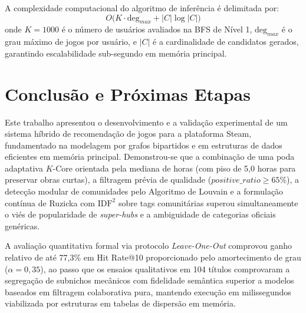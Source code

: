 \documentclass[conference]{IEEEtran}
\begin{document}
A complexidade computacional do algoritmo de inferência é delimitada por:
\begin{equation}
O\big(K \cdot \text{deg}_{max} + |C| \log |C|\big)
\end{equation}
onde $K=1000$ é o número de usuários avaliados na BFS de Nível 1, $\text{deg}_{max}$ é o grau máximo de jogos por usuário, e $|C|$ é a cardinalidade de candidatos gerados, garantindo escalabilidade sub-segundo em memória principal.

\section{Conclusão e Próximas Etapas}

Este trabalho apresentou o desenvolvimento e a validação experimental de um sistema híbrido de recomendação de jogos para a plataforma Steam, fundamentado na modelagem por grafos bipartidos e em estruturas de dados eficientes em memória principal. Demonstrou-se que a combinação de uma poda adaptativa $K$-Core orientada pela mediana de horas (com piso de 5,0 horas para preservar obras curtas), a filtragem prévia de qualidade ($positive\_ratio \ge 65\%$), a detecção modular de comunidades pelo Algoritmo de Louvain e a formulação contínua de Ruzicka com $\text{IDF}^2$ sobre tags comunitárias superou simultaneamente o viés de popularidade de \textit{super-hubs} e a ambiguidade de categorias oficiais genéricas.

A avaliação quantitativa formal via protocolo \textit{Leave-One-Out} comprovou ganho relativo de até 77,3\% em Hit Rate@10 proporcionado pelo amortecimento de grau ($\alpha = 0{,}35$), ao passo que os ensaios qualitativos em 104 títulos comprovaram a segregação de subnichos mecânicos com fidelidade semântica superior a modelos baseados em filtragem colaborativa pura, mantendo execução em milissegundos viabilizada por estruturas em tabelas de dispersão em memória.
\end{document}
